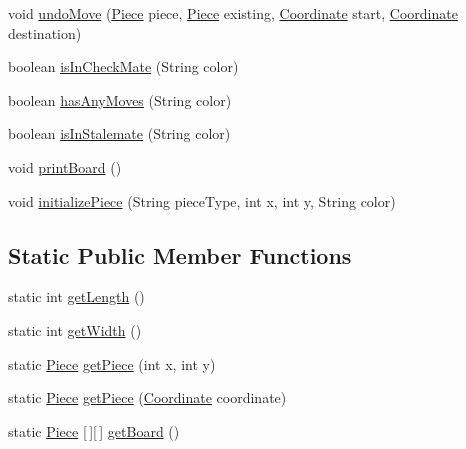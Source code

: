 \begin{DoxyCompactItemize}
void \hyperlink{classmain_1_1board_1_1_board_aa3d88b342a331ba8bb306e77052521a8}{undo\+Move} (\hyperlink{classmain_1_1pieces_1_1_piece}{Piece} piece, \hyperlink{classmain_1_1pieces_1_1_piece}{Piece} existing, \hyperlink{classmain_1_1board_1_1_coordinate}{Coordinate} start, \hyperlink{classmain_1_1board_1_1_coordinate}{Coordinate} destination)
\item 
boolean \hyperlink{classmain_1_1board_1_1_board_a47c04b382880092a0367fce58cc798fc}{is\+In\+Check\+Mate} (String color)
\item 
boolean \hyperlink{classmain_1_1board_1_1_board_aa39f27be6d9f5a96d9f0166823e2c91b}{has\+Any\+Moves} (String color)
\item 
boolean \hyperlink{classmain_1_1board_1_1_board_ae0159180303ed34dc7a1d62280a16bb1}{is\+In\+Stalemate} (String color)
\item 
void \hyperlink{classmain_1_1board_1_1_board_a2677c5c4cac9640e81c005d4edf20047}{print\+Board} ()
\item 
void \hyperlink{classmain_1_1board_1_1_board_a5c19feac8766d7d05bc5a99af9636d9e}{initialize\+Piece} (String piece\+Type, int x, int y, String color)
\end{DoxyCompactItemize}
\subsection*{Static Public Member Functions}
\begin{DoxyCompactItemize}
\item 
static int \hyperlink{classmain_1_1board_1_1_board_a194196590e347f030921920bd507cf6f}{get\+Length} ()
\item 
static int \hyperlink{classmain_1_1board_1_1_board_a3cf270f460073b76eb22f351b8601dc9}{get\+Width} ()
\item 
static \hyperlink{classmain_1_1pieces_1_1_piece}{Piece} \hyperlink{classmain_1_1board_1_1_board_a9178b1987ef4e40bb5db5f42bc9179e4}{get\+Piece} (int x, int y)
\item 
static \hyperlink{classmain_1_1pieces_1_1_piece}{Piece} \hyperlink{classmain_1_1board_1_1_board_a662523cfc4cf13e80816e075fd6bd2cd}{get\+Piece} (\hyperlink{classmain_1_1board_1_1_coordinate}{Coordinate} coordinate)
\item 
static \hyperlink{classmain_1_1pieces_1_1_piece}{Piece} \mbox{[}$\,$\mbox{]}\mbox{[}$\,$\mbox{]} \hyperlink{classmain_1_1board_1_1_board_a3dbd760e456673620d827c7c9d389c93}{get\+Board} ()
\end{DoxyCompactItemize}


